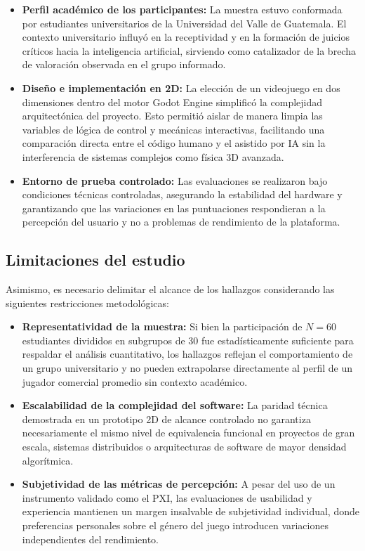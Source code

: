 \begin{itemize}
    \item \textbf{Perfil académico de los participantes:} La muestra estuvo conformada por estudiantes universitarios de la Universidad del Valle de Guatemala. El contexto universitario influyó en la receptividad y en la formación de juicios críticos hacia la inteligencia artificial, sirviendo como catalizador de la brecha de valoración observada en el grupo informado.
    \item \textbf{Diseño e implementación en 2D:} La elección de un videojuego en dos dimensiones dentro del motor Godot Engine simplificó la complejidad arquitectónica del proyecto. Esto permitió aislar de manera limpia las variables de lógica de control y mecánicas interactivas, facilitando una comparación directa entre el código humano y el asistido por IA sin la interferencia de sistemas complejos como física 3D avanzada.
    \item \textbf{Entorno de prueba controlado:} Las evaluaciones se realizaron bajo condiciones técnicas controladas, asegurando la estabilidad del hardware y garantizando que las variaciones en las puntuaciones respondieran a la percepción del usuario y no a problemas de rendimiento de la plataforma.
\end{itemize}

\subsection{Limitaciones del estudio}

Asimismo, es necesario delimitar el alcance de los hallazgos considerando las siguientes restricciones metodológicas:

\begin{itemize}
    \item \textbf{Representatividad de la muestra:} Si bien la participación de $N = 60$ estudiantes divididos en subgrupos de 30 fue estadísticamente suficiente para respaldar el análisis cuantitativo, los hallazgos reflejan el comportamiento de un grupo universitario y no pueden extrapolarse directamente al perfil de un jugador comercial promedio sin contexto académico.
    \item \textbf{Escalabilidad de la complejidad del software:} La paridad técnica demostrada en un prototipo 2D de alcance controlado no garantiza necesariamente el mismo nivel de equivalencia funcional en proyectos de gran escala, sistemas distribuidos o arquitecturas de software de mayor densidad algorítmica.
    \item \textbf{Subjetividad de las métricas de percepción:} A pesar del uso de un instrumento validado como el PXI, las evaluaciones de usabilidad y experiencia mantienen un margen insalvable de subjetividad individual, donde preferencias personales sobre el género del juego introducen variaciones independientes del rendimiento.
\end{itemize}

